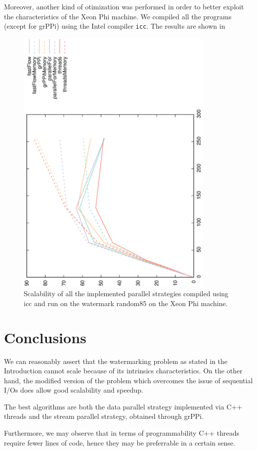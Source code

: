 \documentclass[12pt,a4paper,english]{article}
\begin{document}
Moreover, another kind of otimization was performed in order to better exploit the characteristics of the Xeon Phi machine. We compiled all the programs (except for grPPi) using the Intel compiler \texttt{icc}. The results are shown in 

\begin{figure}[h]
  \centering
  \includegraphics[angle=270, width=0.85\textwidth]{scalabilityicc.eps}
  \vspace{1cm}
  \caption{Scalability of all the implemented parallel strategies compiled using icc and run on the watermark random85 on the Xeon Phi machine.}\label{fig:scalability_icc}
\end{figure}


\section{Conclusions}\label{end}

We can reasonably assert that the watermarking problem as stated in the Introduction cannot scale because of its intrinsics characteristics. On the other hand, the modified version of the problem which overcomes the issue of sequential I/Os does allow good scalability and speedup.

The best algorithms are both the data parallel strategy implemented via C++ threads and the stream parallel strategy, obtained through grPPi.

Furthermore, we may observe that in terms of programmability C++ threads require fewer lines of code, hence they may be preferrable in a certain sense.
\end{document}

